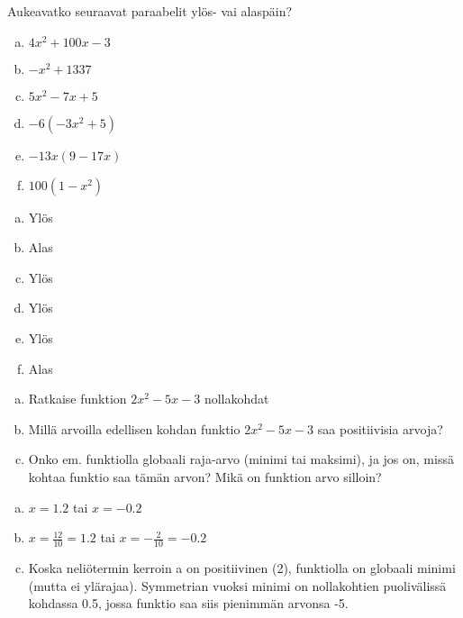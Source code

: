 \begin{tehtava}
  Aukeavatko seuraavat paraabelit ylös- vai alaspäin?
  \begin{enumerate}[a)]
    \item $4x^2 + 100x - 3$
    \item $-x^2 + 1337$
    \item $5x^2 - 7x + 5$
    \item $-6(-3x^2 + 5)$
    \item $-13x(9 - 17x)$ 
    \item $100(1-x^2)$
  \end{enumerate}

  \begin{vastaus}
    \begin{enumerate}[a)]
      \item Ylös
      \item Alas
      \item Ylös
      \item Ylös
      \item Ylös
      \item Alas
    \end{enumerate}
  \end{vastaus}
\end{tehtava}

\begin{tehtava}
  \begin{enumerate}[a)]
    \item Ratkaise funktion $2x^2 - 5x - 3$ nollakohdat
    \item Millä arvoilla edellisen kohdan funktio $2x^2 - 5x - 3$ saa positiivisia arvoja?
    \item Onko em. funktiolla globaali raja-arvo (minimi tai maksimi), ja jos on, missä kohtaa funktio saa tämän arvon? Mikä on funktion arvo silloin?
  \end{enumerate}

  \begin{vastaus}
    \begin{enumerate}[a)]
      \item $x = 1.2$ tai $x = -0.2$
      \item $x = \frac{12}{10} = 1.2$ tai $x = -\frac{2}{10} = -0.2$
      \item Koska neliötermin kerroin a on positiivinen (2), funktiolla on globaali minimi (mutta ei ylärajaa). Symmetrian vuoksi minimi on nollakohtien puolivälissä kohdassa 0.5, jossa funktio saa siis pienimmän arvonsa -5.
    \end{enumerate}
  \end{vastaus}
\end{tehtava}

